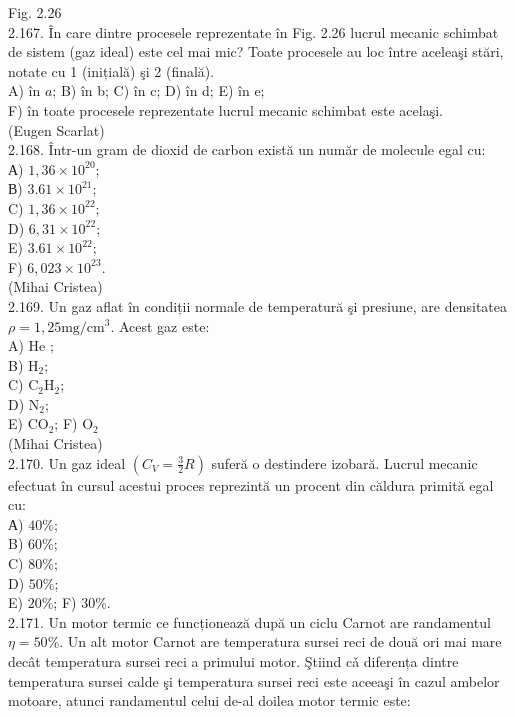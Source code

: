 \documentclass[10pt]{article}
\begin{document}
Fig. 2.26\\
2.167. În care dintre procesele reprezentate în Fig. 2.26 lucrul mecanic schimbat de sistem (gaz ideal) este cel mai mic? Toate procesele au loc între aceleaşi stări, notate cu 1 (inițială) şi 2 (finală).\\
A) în $a$; B) în b; C) în c; D) în d; E) în e;\\
F) în toate procesele reprezentate lucrul mecanic schimbat este acelaşi.\\
(Eugen Scarlat)\\
2.168. Într-un gram de dioxid de carbon există un număr de molecule egal cu:\\
А) $1,36 \times 10^{20}$;\\
В) $3.61 \times 10^{21}$;\\
C) $1,36 \times 10^{22}$;\\
D) $6,31 \times 10^{22}$;\\
E) $3.61 \times 10^{22}$;\\
F) $6,023 \times 10^{23}$.\\
(Mihai Cristea)\\
2.169. Un gaz aflat în condiții normale de temperatură şi presiune, are densitatea $\rho=1,25 \mathrm{mg} / \mathrm{cm}^{3}$. Acest gaz este:\\
A) He ;\\
B) $\mathrm{H}_{2}$;\\
C) $\mathrm{C}_{2} \mathrm{H}_{2}$;\\
D) $\mathrm{N}_{2}$;\\
E) $\mathrm{CO}_{2}$; F) $\mathrm{O}_{2}$\\
(Mihai Cristea)\\
2.170. Un gaz ideal $\left(C_{V}=\frac{3}{2} R\right)$ suferă o destindere izobară. Lucrul mecanic efectuat în cursul acestui proces reprezintă un procent din căldura primită egal cu:\\
А) $40 \%$;\\
B) $60 \%$;\\
C) $80 \%$;\\
D) $50 \%$;\\
E) $20 \%$; F) $30 \%$.\\
2.171. Un motor termic ce funcționează după un ciclu Carnot are randamentul $\eta=50 \%$. Un alt motor Carnot are temperatura sursei reci de două ori mai mare decât temperatura sursei reci a primului motor. Ştiind cǎ diferența dintre temperatura sursei calde şi temperatura sursei reci este aceeaşi în cazul ambelor motoare, atunci randamentul celui de-al doilea motor termic este:\\
\end{document}
